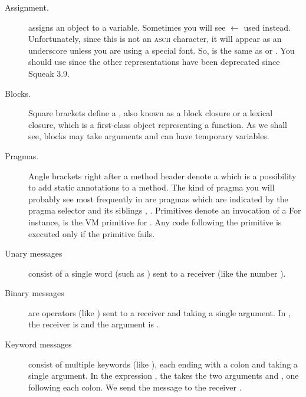 \documentclass[a4paper,10pt,twoside]{book}
\begin{document}
\begin{description}
\item[Assignment.]
	\ct{:=} assigns an object to a variable.
	Sometimes you will see $\leftarrow$ used instead.
	Unfortunately, since this is not an \textsc{ascii} character, it will appear as an underscore unless you are using a special font.
	So,  is the same as  or .
	You should use \ct{:=} since the other representations have been deprecated since Squeak 3.9.

\item[Blocks.]
	Square brackets \ct{[ ]} define a , also known as a block closure or a lexical closure, which is a first-class object representing a function.
	As we shall see, blocks may take arguments and can have temporary variables.

\item[Pragmas.]
	Angle brackets \ct{< >} right after a method header denote a  which is a possibility to add static annotations to a method.
	The kind of pragma you will probably see most frequently in \sq are \emph{} pragmas which are indicated by the pragma selector  and its siblings ,  \etc.
	Primitives denote an invocation of a  
	For instance,  is the VM primitive for .
	Any code following the primitive is executed only if the primitive fails.

\item[Unary messages] consist of a single word (such as ) sent to a receiver (like the number ).

\item[Binary messages] are operators (like \ct{+}) sent to a receiver and taking a single argument.
	In , the receiver is  and the argument is .

\item[Keyword messages] consist of multiple keywords (like ), each ending with a colon and taking a single argument.
	In the expression , the   takes the two arguments  and , one following each colon.
	We send the message to the receiver .


\end{description}
\end{document}
